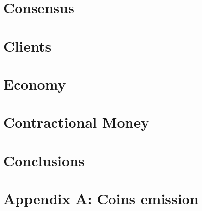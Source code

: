 \documentclass[]{article}
\begin{document}
    \section{Consensus}


    \section{Clients}


    \section{Economy}


    \section{Contractional Money}



    \section{Conclusions}

    

    \section{Appendix A: Coins emission}

\end{document}
